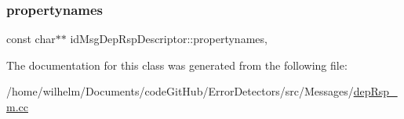 \subsubsection{\texorpdfstring{propertynames}{propertynames}}
{\footnotesize\ttfamily const char$\ast$$\ast$ id\+Msg\+Dep\+Rsp\+Descriptor\+::propertynames\hspace{0.3cm}{\ttfamily [mutable]}, {\ttfamily [private]}}



The documentation for this class was generated from the following file\+:\begin{DoxyCompactItemize}
\item 
/home/wilhelm/\+Documents/code\+Git\+Hub/\+Error\+Detectors/src/\+Messages/\hyperlink{dep_rsp__m_8cc}{dep\+Rsp\+\_\+m.\+cc}\end{DoxyCompactItemize}
